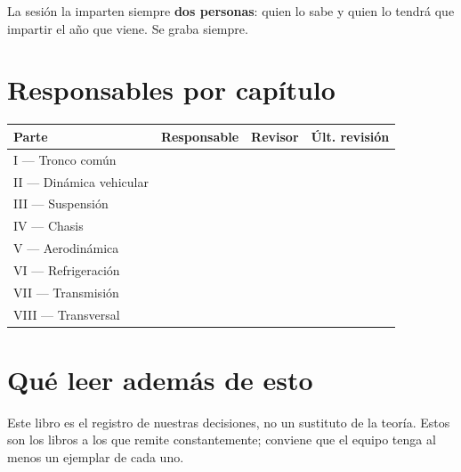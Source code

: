 La sesión la imparten siempre \textbf{dos personas}: quien lo sabe y quien lo
tendrá que impartir el año que viene. Se graba siempre.

\section*{Responsables por capítulo}


\begin{center}
\begin{tabular}{@{}llll@{}}
\toprule
\textbf{Parte} & \textbf{Responsable} & \textbf{Revisor} & \textbf{Últ. revisión} \\
\midrule
I --- Tronco común       & & & \\
II --- Dinámica vehicular & & & \\
III --- Suspensión        & & & \\
IV --- Chasis             & & & \\
V --- Aerodinámica        & & & \\
VI --- Refrigeración      & & & \\
VII --- Transmisión       & & & \\
VIII --- Transversal      & & & \\
\bottomrule
\end{tabular}
\end{center}

\section*{Qué leer además de esto}

Este libro es el registro de nuestras decisiones, no un sustituto de la teoría.
Estos son los libros a los que remite constantemente; conviene que el equipo
tenga al menos un ejemplar de cada uno.

